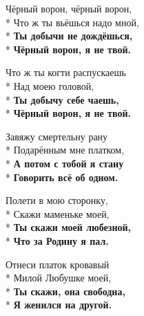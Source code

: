 \medskip

\begin{minipage}{\linewidth}
Чёрный ворон, чёрный ворон,\\*
Что ж ты вьёшься надо мной,\\*
\textbf{Ты добычи не дождёшься,}\\*
\textbf{Чёрный ворон, я не твой.}\\
\end{minipage}\par\medskip\nobreak

\medskip

\begin{minipage}{\linewidth}
Что ж ты когти распускаешь\\*
Над моею головой,\\*
\textbf{Ты добычу себе чаешь,}\\*
\textbf{Чёрный ворон, я не твой.}\\
\end{minipage}\par\medskip\nobreak

\medskip

\begin{minipage}{\linewidth}
Завяжу смертельну рану\\*
Подарённым мне платком,\\*
\textbf{А потом с тобой я стану}\\*
\textbf{Говорить всё об одном.}\\
\end{minipage}\par\medskip\nobreak

\medskip

\begin{minipage}{\linewidth}
Полети в мою сторонку,\\*
Скажи маменьке моей,\\*
\textbf{Ты скажи моей любезной,}\\*
\textbf{Что за Родину я пал.}\\
\end{minipage}\par\medskip\nobreak

\medskip

\begin{minipage}{\linewidth}
Отнеси платок кровавый\\*
Милой Любушке моей,\\*
\textbf{Ты скажи, она свободна,}\\*
\textbf{Я женился на другой.}\\
\end{minipage}\par\medskip\nobreak

